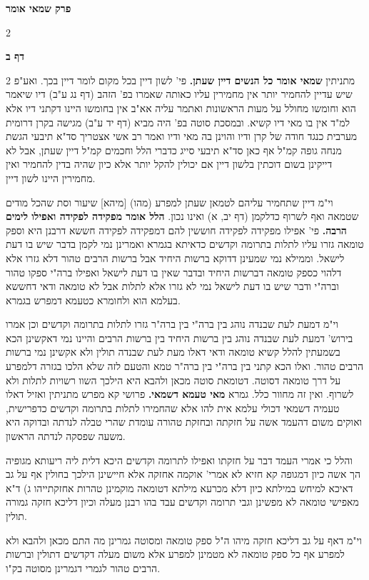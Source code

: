 \documentclass[12pt, openany]{book}
\newcommand{\sethebfont}{
\fontsize{10.5pt}{21.0pt} \selectfont
}
\newcommand{\twocol}[1]{
	{\sethebfont \begin{multicols}{2}
			#1
	\end{multicols}}	
}
\newcommand{\chapname}{}
\newcommand{\sectname}{}
\newcommand{\newchap}[1]{
	\addcontentsline{toc}{chapter}{#1}
	\renewcommand{\chapname}{#1}
		\begin{center}
			\textbf{%
\fontsize{16pt}{16pt}\selectfont
				#1}
		\end{center}
}
\newcommand{\newsection}[1]{
	\renewcommand{\sectname}{#1}	
	\vspace{-\baselineskip}
	\begin{center}
		\textbf{%
\fontsize{16pt}{16pt}\selectfont
			#1}
	\end{center}
	\vspace{-\baselineskip}
	\nopagebreak
}
\begin{document}
\newchap{פרק  שמאי אומר}
\twocol{\clearpage}

\newsection{דף ב}
\twocol{מתניתין \textbf{שמאי אומר כל הנשים דיין שעתן.} פי' לשון דיין בכל מקום לומר דיין בכך. ואע"פ שיש עדיין להחמיר יותר אין מחמירין עליו כאותה שאמרו בפ' הזהב (דף נג ע"ב) דיו שיאמר הוא וחומשו מחולל על מעות הראשונות ואתמר עליה אא"ב אין בחומשו היינו דקתני דיו אלא למ"ד אין בו מאי דיו קשיא. ובמסכת סוטה בפ' היה מביא (דף יד ע"ב) מגישה בקרן דרומית מערבית כנגד חודה של קרן ודיו והוינן בה מאי ודיו ואמר רב אשי אצטריך סד"א תיבעי הגשת מנחה גופה קמ"ל אף כאן סד"א תיבעי סייג כדברי הלל וחכמים קמ"ל דיין שעתן, אבל לא דייקינן בשום דוכתין בלשון דיין אם יכולין להקל יותר אלא כיון שהיה בדין להחמיר ואין מחמירין היינו לשון דיין.\par וי"מ דיין שתחמיר עליהם לטמאן שעתן למפרע (מהו) [מיהא] שיעור וסת שהכל מודים שטמאה ואף לשרוף כדלקמן (דף יב, א) ואינו נכון. 
\textbf{הלל אומר מפקידה לפקידה ואפילו לימים הרבה.} פי' אפילו מפקידה לפקידה חוששין להם דמפקידה לפקידה חששא דרבנן היא וספק טומאה גזרו עליו לתלות בתרומה וקדשים כדאיתא בגמרא ואמרינן נמי לקמן בדבר שיש בו דעת לישאל. וממילא נמי שמעינן דדוקא ברשות היחיד אבל ברשות הרבים טהור דלא גזרו אלא דלהוי כספק טומאה דברשות היחיד ובדבר שאין בו דעת לישאל ואפילו ברה"י ספקו טהור וברה"י ודבר שיש בו דעת לישאל נמי לא גזרו אלא לתלות אבל לא טומאה ודאי דחששא בעלמא הוא ולחומרא כטעמא דמפרש בגמרא.\par וי"מ דמעת לעת שבנדה נוהג בין ברה"י בין ברה"ר גזרו לתלות בתרומה וקדשים וכן אמרו בירוש' דמעת לעת שבנדה נוהג בין ברשות היחיד בין ברשות הרבים והיינו נמי דאקשינן הכא בשמעתין להלל קשיא טומאה ודאי דאלו מעת לעת שבנדה תולין ולא אקשינן נמי ברשות הרבים טהור. ואלו הכא קתני בין ברה"י בין ברה"ר טמא והטעם לזה שלא הלכו בגזרה דלמפרע על דרך טומאה דסוטה. דטומאת סוטה מכאן ולהבא היא הילכך השוו רשויות לתלות ולא לשרוף. ואין זה מחוור כלל. 
גמרא \textbf{מאי טעמא דשמאי.} פרושי קא מפרש מתניתין ואזיל דאלו טעמיה דשמאי דכולי עלמא אית להו אלא שהחמירו לתלות בתרומה וקדשים כדפרישית, ואוקים משום דהעמד אשה על חזקתה ובחזקת טהורה עומדת שהרי טבלה לנדתה ובדוקה היא משעה שפסקה לנדתה הראשון.\par והלל כי אמרי העמד דבר על חזקתו ואפילו לתרומה וקדשים היכא דלית ליה ריעותא מגופיה הך אשה כיון דמגופה קא חזיא לא אמרי' אוקמה אחזקה אלא חיישינן הילכך בחולין אף על גב דאיכא למיחש במילתא כיון דלא מכרעא מילתא דטומאה מוקמינן טהרות אחזקתייהו ג) ד"א מאפישי טומאה לא מפשינן וגבי תרומה וקדשים עבד בהו רבנן מעלה וכיון דליכא חזקה גמורה תולין.\par וי"מ דאף על גב דליכא חזקה מיהו ה"ל ספק טומאה ומסוטה גמרינן מה התם מכאן ולהבא ולא למפרע אף כל ספק טומאה לא מטמינן למפרע אלא משום מעלה דקדשים דתולין וברשות הרבים טהור לגמרי דגמרינן מסוטה בק"ו. 
}
\end{document}
